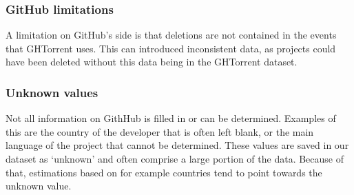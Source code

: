 \subsubsection{GitHub limitations}
A limitation on GitHub's side is that deletions are not contained in the events that GHTorrent uses.\cite{gousios-2013}
This can introduced inconsistent data, as projects could have been deleted without this data being in the GHTorrent dataset.\\

\subsubsection{Unknown values}
Not all information on GithHub is filled in or can be determined.
Examples of this are the country of the developer that is often left blank, or the main language of the project that cannot be determined.
These values are saved in our dataset as `unknown' and often comprise a large portion of the data.
Because of that, estimations based on for example countries tend to point towards the unknown value.